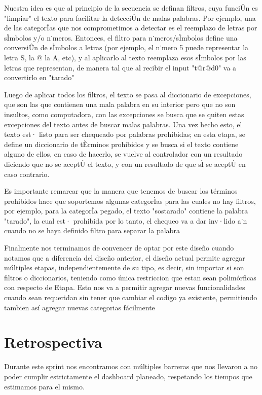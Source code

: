 Nuestra idea es que al principio de la secuencia se definan filtros, cuya funciÛn es "limpiar" el texto para facilitar la detecciÛn de malas palabras. Por ejemplo, una de las categorÌas que nos comprometimos a detectar es el reemplazo de letras por sÌmbolos y/o n˙meros. Entonces, el filtro para n˙meros/sÌmbolos define una conversiÛn de sÌmbolos a letras (por ejemplo, el n˙mero 5 puede representar la letra S, la @ la A, etc), y al aplicarlo al texto reemplaza esos sÌmbolos por las letras que representan, de manera tal que al recibir el input "t@r@d0" va a convertirlo en "tarado"

Luego de aplicar todos los filtros, el texto se pasa al diccionario de excepciones, que son las que contienen una mala palabra en su interior pero que no son insultos, como computadora, con las excepciones se busca que se quiten estas excepciones del texto antes de buscar malas palabras. Una vez hecho esto, el texto est· listo para ser chequeado por palabras prohibidas; en esta etapa, se define un diccionario de tÈrminos prohibidos y se busca si el texto contiene alguno de ellos, en caso de hacerlo, se vuelve al controlador con un resultado diciendo que no se aceptÛ el texto, y con un resultado de que sÌ se aceptÛ en caso contrario. 

Es importante remarcar que la manera que tenemos de buscar los términos prohibidos hace que soportemos algunas categorÌas para las cuales no hay filtros, por ejemplo, para la categorÌa pegado, el texto "sostarado" contiene la palabra "tarado", la cual est· prohibida por lo tanto, el chequeo va a dar inv·lido a˙n cuando no se haya definido filtro para separar la palabra

Finalmente nos terminamos de convencer de optar por este diseño cuando notamos que a diferencia del diseño anterior, el diseño actual permite agregar múltiples etapas, independientemente de su tipo, es decir, sin importar si son filtros o diccionarios, teniendo como única restriccion que estan sean polimórficas con respecto de Etapa. Esto nos va a permitir agregar nuevas funcionalidades cuando sean requeridan sin tener que cambiar el codigo ya existente, permitiendo tambien así agregar nuevas categorias fácilmente

\section{Retrospectiva}

Durante este sprint nos encontramos con múltiples barreras que nos llevaron a no poder cumplir estrictamente el dashboard planeado, respetando los tiempos que estimamos para el mismo.


